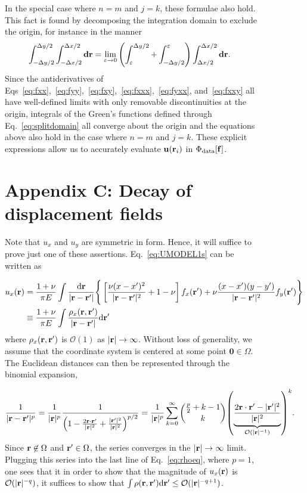 \documentclass[aps,prl,reprint,twocolumn,groupedaddress,showpacs]{revtex4}
\def\d{{\bf d}}
\def\dd{\mbox{d}}
\def\f{{\bf f}}
\def\r{{\bf r}}
\def\u{{\bf u}}
\begin{document}
\begin{figure}
\begin{widetext}
In the special case where $n=m$ and $j=k$, these formulae also
hold. This fact is found by decomposing the integration domain to
exclude the origin, for instance in the manner
\begin{equation}
\int_{ -\Delta y/2 }^{\Delta y/2 }\int_{- \Delta x/2 }^{\Delta x/2 } \d\r = 
\lim_{\varepsilon\to0} \left( \int_\varepsilon^{\Delta y/2}  
+  \int_{-\Delta y/2}^\varepsilon   \right)\int_{\Delta x/2}^{\Delta x/2} \d\r.~\label{eq:splitdomain}
\end{equation}
Since the antiderivatives of
Eqs~\ref{eq:fxx},~\ref{eq:fyy},~\ref{eq:fxy},~\ref{eq:fxxx},~\ref{eq:fyxx},
and~\ref{eq:fxxy} all have well-defined limits with only removable
discontinuities at the origin, integrals of the Green's functions
defined through Eq.~\ref{eq:splitdomain} all converge about the origin
and the equations above also hold in the case where $n=m$ and $j=k$.
These explicit expressions allow us to accurately evaluate
$\u(\r_{i})$ in $\Phi_{\rm data}[\f]$.

\section{Appendix C: Decay of displacement fields}

Note that $u_x$ and $u_y$ are symmetric in form. Hence, it will
suffice to prove just one of these assertions. Eq.~\ref{eq:UMODEL1s}
can be written as

\begin{align}
u_x(\r) & = \frac{1+\nu}{\pi E} \int \frac{\dd \r}{|\r-\r'|} 
\Bigg\{ \left[ \frac{\nu(x - x')^2}{|\r-\r'|^2} + 1-\nu \right]f_{x}(\r') +
\nu\frac{(x-x')(y-y')}{|\r-\r'|^2} f_y(\r')  \Bigg\} \nonumber\\
& \equiv \frac{1+\nu}{\pi E}   \int\frac{\rho_x(\r,\r')}{|\r-\r'|} \dd \r'  \label{eq:rhoeq}
\end{align}
where $\rho_x(\r,\r')$ is $\mathcal{O}(1)$ as
$\vert\r\vert\to\infty$. Without loss of generality, we assume that
the coordinate system is centered at some point
$\mathbf{0}\in\Omega$. The Euclidean distances can then be represented
through the binomial expansion,

\begin{align}
\frac{1}{|\r-\r'|^p} &= \frac{1}{|\r|^p}\frac{1}{\left(1 - \frac{2\r\cdot\r'}{|\r|^2} 
+\frac{\vert\r'\vert^{2}}{\vert\r\vert^{2}}\right)^{p/2}} = \frac{1}{|\r|^p}\sum_{k=0}^\infty {{{p\over 2}+k-1}\choose{k}} 
{\left( \underbrace{ \frac{2\r\cdot\r' - |\r'|^2}{|\r|^2}}_{\mathcal{O}(|\r|^{-1})} \right)}^k.
\end{align}
% 
Since $\r\not\in\Omega$ and $\r'\in\Omega$, the series converges in
the $\vert \r\vert \to \infty$ limit. Plugging this series into the
last line of Eq.~\ref{eq:rhoeq}, where $p=1$, one sees that it in order to show
that the magnitude of $u_x(\r)$ is $\mathcal{O}(|\r|^{-q})$, it
suffices to show that $\int \rho(\r,\r')\dd\r' \leq
{\cal O}(|\r|^{-q+1})$.


\end{widetext}
\end{figure}
\end{document}
